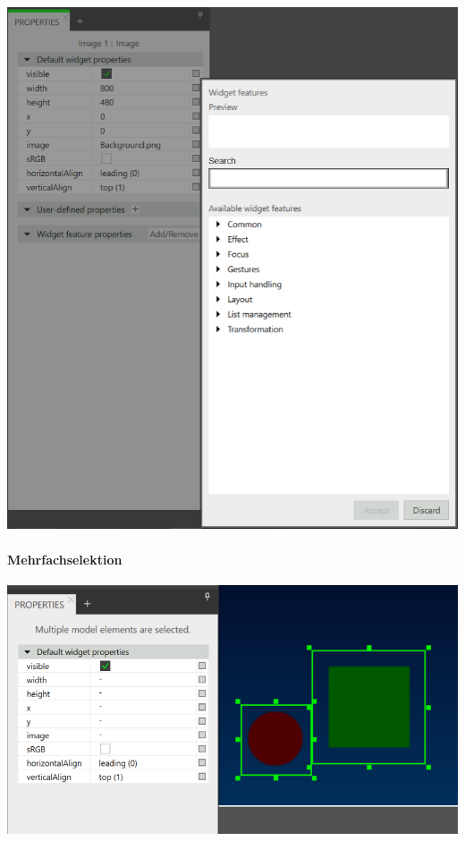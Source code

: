 \begin{center}
  \includegraphics[scale=0.4]{figures/WidgetFeatureProperty_Adaption.png}
  \label{fig:FeatureProperty_Adaption}
\end{center}


\paragraph{Mehrfachselektion}

\begin{center}
  \includegraphics[scale=0.4]{figures/Mehrfachselektion_Adaption.png}
  \label{fig:Mehrfachselektion_Adaption}
\end{center}

